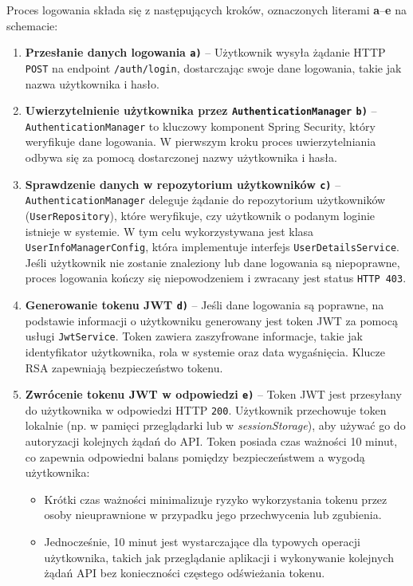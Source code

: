 Proces logowania składa się z następujących kroków, oznaczonych literami \textbf{a}–\textbf{e} na schemacie:

\begin{enumerate}
    \item \textbf{Przesłanie danych logowania \texttt{a)}} -- Użytkownik wysyła żądanie HTTP \texttt{POST} na endpoint \texttt{/auth/login}, dostarczając swoje dane logowania, takie jak nazwa użytkownika i hasło. 
		
    \item \textbf{Uwierzytelnienie użytkownika przez \texttt{AuthenticationManager} \texttt{b)}} -- \texttt{AuthenticationManager} to kluczowy komponent Spring Security, który weryfikuje dane logowania. W pierwszym kroku proces uwierzytelniania odbywa się za pomocą dostarczonej nazwy użytkownika i hasła.

    \item \textbf{Sprawdzenie danych w repozytorium użytkowników \texttt{c)}} -- \texttt{AuthenticationManager} deleguje żądanie do repozytorium użytkowników (\texttt{UserRepository}), które weryfikuje, czy użytkownik o podanym loginie istnieje w systemie. W tym celu wykorzystywana jest klasa \texttt{UserInfoManagerConfig}, która implementuje interfejs \texttt{UserDetailsService}. Jeśli użytkownik nie zostanie znaleziony lub dane logowania są niepoprawne, proces logowania kończy się niepowodzeniem i zwracany jest status \texttt{HTTP 403}.

    \item \textbf{Generowanie tokenu JWT \texttt{d)}} -- Jeśli dane logowania są poprawne, na podstawie informacji o użytkowniku generowany jest token JWT za pomocą usługi \texttt{JwtService}. Token zawiera zaszyfrowane informacje, takie jak identyfikator użytkownika, rola w systemie oraz data wygaśnięcia. Klucze RSA zapewniają bezpieczeństwo tokenu.

    \item \textbf{Zwrócenie tokenu JWT w odpowiedzi \texttt{e)}} -- Token JWT jest przesyłany do użytkownika w odpowiedzi HTTP \texttt{200}. Użytkownik przechowuje token lokalnie (np. w pamięci przeglądarki lub w \emph{sessionStorage}), aby używać go do autoryzacji kolejnych żądań do API. Token posiada czas ważności 10 minut, co zapewnia odpowiedni balans pomiędzy bezpieczeństwem a wygodą użytkownika:
\begin{itemize}
    \item Krótki czas ważności minimalizuje ryzyko wykorzystania tokenu przez osoby nieuprawnione w przypadku jego przechwycenia lub zgubienia.
    \item Jednocześnie, 10 minut jest wystarczające dla typowych operacji użytkownika, takich jak przeglądanie aplikacji i wykonywanie kolejnych żądań API bez konieczności częstego odświeżania tokenu.
\end{itemize}
 
\end{enumerate}

